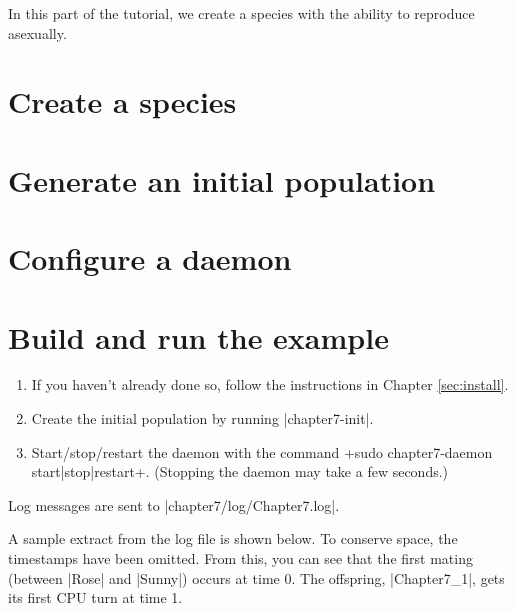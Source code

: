 \documentclass[a4paper,10pt]{report}
\begin{document}
In this part of the tutorial, we create a species with the
ability to reproduce asexually.

\section{Create a species}
\label{sec:species2}



\section{Generate an initial population}
\label{sec:pop2}



\section{Configure a daemon}
\label{sec:daemon2}



\section{Build and run the example}
\label{sec:run2}

\begin{enumerate}
\item If you haven't already done so, follow the instructions in Chapter 
\ref{sec:install}.
\item Create the initial population by running |chapter7-init|.
\item Start/stop/restart the daemon with the command
\UndefineShortVerb{\|}
\DefineShortVerb{\+}
+sudo chapter7-daemon start|stop|restart+.
\UndefineShortVerb{\+}
\DefineShortVerb{\|}
(Stopping the daemon may take a few seconds.)
\end{enumerate}

Log messages are sent to |chapter7/log/Chapter7.log|.

A sample extract from the log file is shown below.
To conserve space, the timestamps have been omitted.
From this, you can see that the first mating (between |Rose| and |Sunny|)
occurs at time 0.
The offspring, |Chapter7_1|, gets its first CPU turn at time 1.
\end{document}

